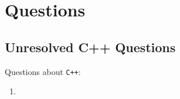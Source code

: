 









\chapter{Questions}
\label{chp:Questions}




\section{Unresolved C++ Questions}
\label{sec:UnresolvedCppQuestions}

Questions about {\tt C++}: \vspace{-0.3cm}
\begin{enumerate} \itemsep -4pt
\item 
\end{enumerate}








